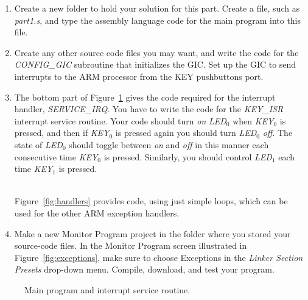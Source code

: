 \documentclass[epsfig,10pt,fullpage]{article}
\begin{document}
\begin{enumerate}
\item Create a new folder to hold your solution for this part. Create a
file, such as {\it part1.s}, and type the assembly language code for the main program 
into this file. 

\item Create any other source code files you may want, and write the code for the
{\it CONFIG\_GIC} subroutine that initializes the GIC. Set up the GIC to send interrupts
to the ARM processor from the KEY pushbuttons port. 

\item 
The bottom part of Figure~\ref{fig:code} gives the code required for the interrupt handler, 
{\it SERVICE\_IRQ}.  You have to write the code for the {\it KEY\_ISR} interrupt service routine.
Your code should turn {\it on} {\it LED}$_0$ when {\it KEY}$_0$ is pressed, and then 
if {\it KEY}$_0$ is pressed again you should turn {\it LED}$_0$ {\it off}. The state 
of {\it LED}$_0$ should toggle between {\it on} and {\it off} in this manner each consecutive
time {\it KEY}$_0$ is pressed. Similarly, you should control {\it LED}$_1$ each time 
{\it KEY}$_1$ is pressed.

~\\
Figure~\ref{fig:handlers} provides code, using just simple loops, which can be used for the
other ARM exception handlers.

\item
Make a new Monitor Program project in the folder where you stored your source-code files.
In the Monitor Program screen illustrated in Figure~\ref{fig:exceptions}, make sure 
to choose {\sf Exceptions} in the {\it Linker Section Presets} drop-down menu.
Compile, download, and test your program. 
\end{enumerate}
\begin{figure}[H]
\begin{center}
\begin{minipage}[t]{16.5 cm}

\end{minipage}
\end{center}
\caption{Main program and interrupt service routine.}
\label{fig:code}
\end{figure}
\end{document}
